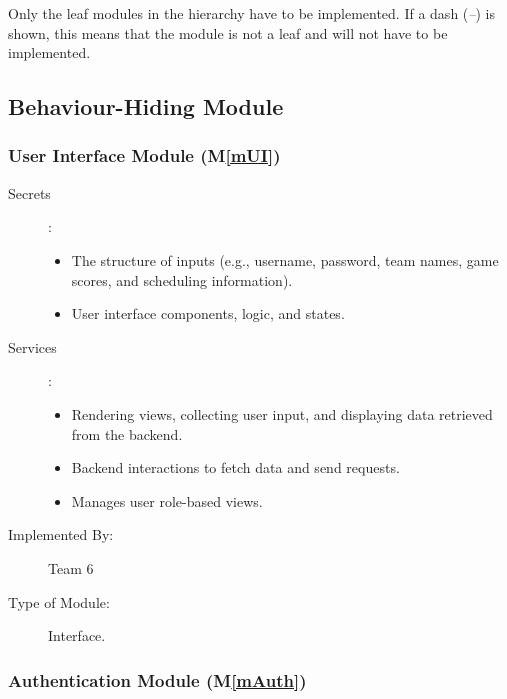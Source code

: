 \documentclass[12pt, titlepage]{article}
\newcommand{\mref}[1]{M\ref{#1}}
\begin{document}
Only the leaf modules in the hierarchy have to be implemented. If a dash
(\emph{--}) is shown, this means that the module is not a leaf and will not have
to be implemented.

\subsection{Behaviour-Hiding Module}

\subsubsection{User Interface Module (\mref{mUI})}

\begin{description}
\item[Secrets]: 
    \begin{itemize}
        \item The structure of inputs (e.g., username, password, team names, game scores, and scheduling information). 
        \item User interface components, logic, and states.
    \end{itemize}
    
\item[Services]: 
    \begin{itemize}
        \item Rendering views, collecting user input, and displaying data retrieved from the backend.
        \item Backend interactions to fetch data and send requests.
        \item Manages user role-based views.
    \end{itemize}

\item[Implemented By:] Team 6
    
\item[Type of Module:] Interface.

\end{description}

\subsubsection{Authentication Module (\mref{mAuth})}
\end{document}
